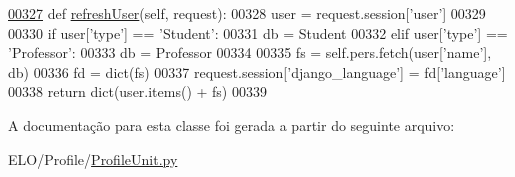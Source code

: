 \begin{DoxyCode}
\hypertarget{classProfile_1_1ProfileUnit_1_1BusProfile_l00327}{}\hyperlink{classProfile_1_1ProfileUnit_1_1BusProfile_ace81426164b30cfa2871e6093052934d}{00327}     \textcolor{keyword}{def }\hyperlink{classProfile_1_1ProfileUnit_1_1BusProfile_ace81426164b30cfa2871e6093052934d}{refreshUser}(self, request):
00328         user = request.session[\textcolor{stringliteral}{'user'}]
00329 
00330         \textcolor{keywordflow}{if} user[\textcolor{stringliteral}{'type'}] == \textcolor{stringliteral}{'Student'}:
00331             db = Student
00332         \textcolor{keywordflow}{elif} user[\textcolor{stringliteral}{'type'}] == \textcolor{stringliteral}{'Professor'}:
00333             db = Professor
00334 
00335         fs = self.pers.fetch(user[\textcolor{stringliteral}{'name'}], db)
00336         fd = dict(fs)
00337         request.session[\textcolor{stringliteral}{'django\_language'}] = fd[\textcolor{stringliteral}{'language'}]
00338         \textcolor{keywordflow}{return} dict(user.items() + fs)
00339 
\end{DoxyCode}


A documentação para esta classe foi gerada a partir do seguinte arquivo\+:\begin{DoxyCompactItemize}
\item 
E\+L\+O/\+Profile/\hyperlink{ProfileUnit_8py}{Profile\+Unit.\+py}\end{DoxyCompactItemize}
